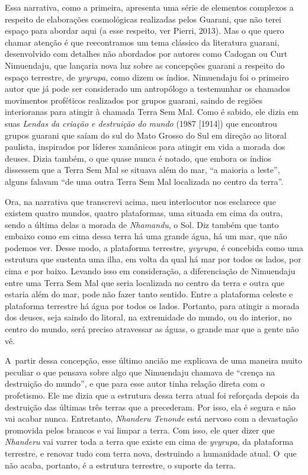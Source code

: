 Essa narrativa, como a primeira, apresenta uma série de elementos
complexos a respeito de elaborações cosmológicas realizadas pelos
Guarani, que não terei espaço para abordar aqui (a esse respeito, ver
Pierri, 2013). Mas o que quero chamar atenção é que reecontramos um
tema clássico da literatura guarani, desenvolvido com detalhes não
abordados por autores como Cadogan ou Curt Nimuendaju, que lançaria
nova luz sobre as concepções guarani a respeito do espaço terrestre, de
\emph{yvyrupa}, como dizem os índios. Nimuendaju foi o primeiro autor que já
pode ser considerado um antropólogo a testemunhar os chamados
movimentos proféticos realizados por grupos guarani, saindo de regiões
interioranas para atingir à chamada Terra Sem Mal. Como é sabido, ele
dizia em suas \emph{Lendas da criação e destruição do mundo} (1987 [1914]) que
encontrou grupos guarani que saíam do sul do Mato Grosso do Sul em
direção ao litoral paulista, inspirados por líderes xamânicos para
atingir em vida a morada dos deuses. Dizia também, o que quase nunca é
notado, que embora os índios dissessem que a Terra Sem Mal se situava
além do mar, ``a maioria a leste'', alguns falavam ``de uma outra Terra
Sem Mal localizada no centro da terra''.

Ora, na narrativa que transcrevi acima, meu interlocutor nos esclarece
que existem quatro mundos, quatro plataformas, uma situada em cima da
outra, sendo a última delas a morada de \emph{Nhamandu}, o Sol. Diz também que
tanto embaixo como em cima dessa terra há uma grande água, há um mar,
que não podemos ver. Desse modo, a plataforma terrestre, \emph{yvyrupa}, é
concebida como uma estrutura que sustenta uma ilha, em volta da qual há
mar por todos os lados, por cima e por baixo. Levando isso em
consideração, a diferenciação de Nimuendaju entre uma Terra Sem Mal que
seria localizada no centro da terra e outra que estaria além do mar,
pode não fazer tanto sentido. Entre a plataforma celeste e plataforma
terrestre há água por todos os lados. Portanto, para atingir a morada
dos deuses, seja saindo do litoral, na extremidade do mundo, ou do
interior, no centro do mundo, será preciso atravessar as águas, o
grande mar que a gente não vê.

A~partir dessa concepção, esse último ancião me explicava de uma maneira
muito peculiar o que pensava sobre algo que Nimuendaju chamava de
``crença na destruição do mundo'', e que para esse autor tinha relação
direta com o profetismo. Ele me dizia que a estrutura dessa terra atual
foi reforçada depois da destruição das últimas três terras que a
precederam. Por isso, ela é segura e não vai acabar nunca. Entretanto,
\emph{Nhanderu Tenonde} está nervoso com a devastação promovida pelos brancos
e vai limpar a terra. Com isso, ele quer dizer que \emph{Nhanderu} vai varrer
toda a terra que existe em cima de \emph{yvyrupa}, da plataforma terrestre, e
renovar tudo com terra nova, destruindo a humanidade atual. O~que não
acaba, portanto, é a estrutura terrestre, o suporte da terra. 

